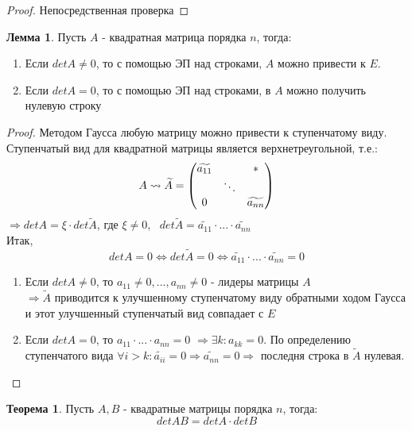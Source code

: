 \documentclass[a4paper, 12pt]{article}
\newcounter{lemcount}
\newcounter{lemcount2}
\newcounter{thcount}
\theoremstyle{definition}
\newtheorem{lemmanum2}[lemcount2]{Лемма}
\newtheorem{theoremnum}[thcount]{Теорема}
\begin{document}
  \begin{proof}
    Непосредственная проверка
  \end{proof}
  \begin{lemmanum2} \label{lemma2}
    Пусть $A$ - квадратная матрица порядка $n$, тогда:
    \begin{enumerate}
      \item Если $detA \not = 0$, то с помощью ЭП над строками, $A$ можно привести к $E$. 
      \item Если $detA = 0$, то с помощью ЭП над строками, в $A$ можно получить нулевую строку
    \end{enumerate}
  \end{lemmanum2} 
  \begin{proof}
    Методом Гаусса любую матрицу можно привести к ступенчатому виду. Ступенчатый вид для квадратной матрицы является верхнетреугольной, т.е.:
    $$A \leadsto \widetilde{A} = \begin{pmatrix}
      \widetilde{a_{11}} & \null & * \\
      \null & \ddots & \null \\
      0 & \null & \widetilde{a_{nn}}
    \end{pmatrix}$$  
    $\Longrightarrow detA = \xi \cdot det \widetilde{A}$, где $\xi \not = 0$, \ $det \widetilde{A} = \widetilde{a_{11}} \cdot ... \cdot \widetilde{a_{nn}}$\\
    Итак, 
    $$detA =0 \Longleftrightarrow  det \widetilde{A} = 0 \Longleftrightarrow \widetilde{a_{11}} \cdot ... \cdot \widetilde{a_{nn}} =0$$ 
    \begin{enumerate}
      \item Если $detA \not = 0$, то $a_{11} \not = 0,...,a_{nn} \not = 0$ - лидеры матрицы $A$ \\ $\Longrightarrow \widetilde{A}$  приводится к улучшенному ступенчатому виду обратными ходом Гаусса и этот улучшенный ступенчатый вид совпадает с $E$
      \item Если $detA = 0$, то $a_{11} \cdot...\cdot a_{nn} = 0$ $\Longrightarrow  \exists k: a_{kk} = 0$. По определению ступенчатого вида $\forall i > k: \widetilde{a_{ii}} = 0 \Longrightarrow \widetilde{a_{nn}} = 0 \Longrightarrow$ последня строка в $\widetilde{A}$ нулевая.  
    \end{enumerate}
  \end{proof} 
  \begin{theoremnum}
    Пусть $A, B$ - квадратные матрицы порядка $n$, тогда: $$detAB = detA \cdot detB$$ 
  \end{theoremnum} 
\end{document}
